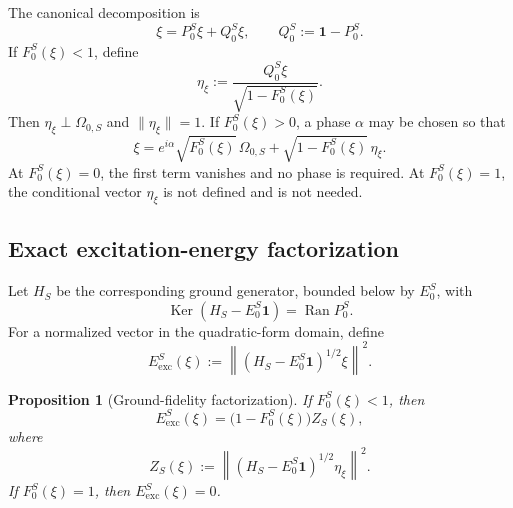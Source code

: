 \documentclass[11pt,reqno]{scrartcl}
\newcommand{\idop}{\mathbf 1}
\DeclareMathOperator{\Ran}{Ran}
\DeclareMathOperator{\Ker}{Ker}
\theoremstyle{plain}
\newtheorem{proposition}[proposition]{Proposition}
\theoremstyle{definition}
\theoremstyle{remark}
\begin{document}
The canonical decomposition is
\begin{equation}
  \xi=P_0^S\xi+Q_0^S\xi,
  \qquad
  Q_0^S:=\idop-P_0^S.
  \label{eq:ground-orthogonal-decomposition}
\end{equation}
If $F_0^S(\xi)<1$, define
\begin{equation}
  \eta_{\xi}
  :=\frac{Q_0^S\xi}{\sqrt{1-F_0^S(\xi)}}.
  \label{eq:conditional-excitation-vector}
\end{equation}
Then $\eta_{\xi}\perp\Omega_{0,S}$ and $\|\eta_{\xi}\|=1$.  If
$F_0^S(\xi)>0$, a phase $\alpha$ may be chosen so that
\begin{equation}
  \xi
  =e^{i\alpha}\sqrt{F_0^S(\xi)}\,\Omega_{0,S}
  +\sqrt{1-F_0^S(\xi)}\,\eta_{\xi}.
  \label{eq:fidelity-state-decomposition}
\end{equation}
At $F_0^S(\xi)=0$, the first term vanishes and no phase is required.  At
$F_0^S(\xi)=1$, the conditional vector $\eta_{\xi}$ is not defined and is not
needed.

\subsection{Exact excitation-energy factorization}

Let $H_S$ be the corresponding ground generator, bounded below by
$E_0^S$, with
\begin{equation}
  \Ker(H_S-E_0^S\idop)=\Ran P_0^S.
\end{equation}
For a normalized vector in the quadratic-form domain, define
\begin{equation}
  E_{\mathrm{exc}}^S(\xi)
  :=\left\|
  (H_S-E_0^S\idop)^{1/2}\xi
  \right\|^2.
  \label{eq:excitation-energy-general}
\end{equation}

\begin{proposition}[Ground-fidelity factorization]
\label{prop:ground-fidelity-factorization}
If $F_0^S(\xi)<1$, then
\begin{equation}
  \boxed{
  E_{\mathrm{exc}}^S(\xi)
  =
  \bigl(1-F_0^S(\xi)\bigr)
  Z_S(\xi),}
  \label{eq:ground-fidelity-factorization}
\end{equation}
where
\begin{equation}
  Z_S(\xi)
  :=\left\|
  (H_S-E_0^S\idop)^{1/2}\eta_{\xi}
  \right\|^2.
  \label{eq:conditional-excitation-energy}
\end{equation}
If $F_0^S(\xi)=1$, then $E_{\mathrm{exc}}^S(\xi)=0$.
\end{proposition}
\end{document}
